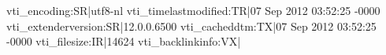 vti_encoding:SR|utf8-nl
vti_timelastmodified:TR|07 Sep 2012 03:52:25 -0000
vti_extenderversion:SR|12.0.0.6500
vti_cacheddtm:TX|07 Sep 2012 03:52:25 -0000
vti_filesize:IR|14624
vti_backlinkinfo:VX|
